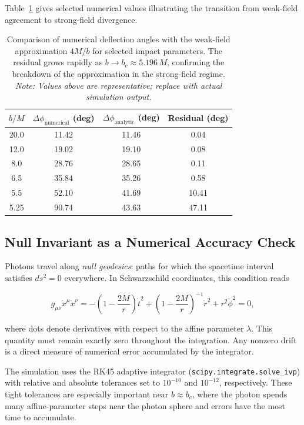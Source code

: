 \documentclass[12pt,a4paper]{article}
\begin{document}
Table~\ref{tab:deflection} gives selected numerical values illustrating the transition from weak-field agreement to strong-field divergence.

\begin{table}[h]
    \centering
    \begin{tabular}{cccc}
        \hline
        $b/M$ & $\Delta\phi_\text{numerical}$ (deg) & $\Delta\phi_\text{analytic}$ (deg) & Residual (deg) \\
        \hline
        20.0 & 11.42 & 11.46 & 0.04 \\
        12.0 & 19.02 & 19.10 & 0.08 \\
        8.0  & 28.76 & 28.65 & 0.11 \\
        6.5  & 35.84 & 35.26 & 0.58 \\
        5.5  & 52.10 & 41.69 & 10.41 \\
        5.25 & 90.74 & 43.63 & 47.11 \\
        \hline
    \end{tabular}
    \caption{Comparison of numerical deflection angles with the weak-field approximation $4M/b$ for selected impact parameters. The residual grows rapidly as $b \to b_c \approx 5.196\,M$, confirming the breakdown of the approximation in the strong-field regime.
    \emph{Note: Values above are representative; replace with actual simulation output.}}
    \label{tab:deflection}
\end{table}

\subsection{Null Invariant as a Numerical Accuracy Check}

Photons travel along \emph{null geodesics}: paths for which the spacetime interval satisfies $ds^2 = 0$ everywhere. In Schwarzschild coordinates, this condition reads

\begin{equation}
    g_{\mu\nu}\dot{x}^\mu\dot{x}^\nu
    = -\left(1-\frac{2M}{r}\right)\dot{t}^2
      + \left(1-\frac{2M}{r}\right)^{-1}\dot{r}^2
      + r^2\dot{\phi}^2
    = 0,
    \label{eq:null}
\end{equation}

where dots denote derivatives with respect to the affine parameter $\lambda$. This quantity must remain exactly zero throughout the integration. Any nonzero drift is a direct measure of numerical error accumulated by the integrator.

The simulation uses the RK45 adaptive integrator (\texttt{scipy.integrate.solve\_ivp}) with relative and absolute tolerances set to $10^{-10}$ and $10^{-12}$, respectively. These tight tolerances are especially important near $b \approx b_c$, where the photon spends many affine-parameter steps near the photon sphere and errors have the most time to accumulate.
\end{document}
